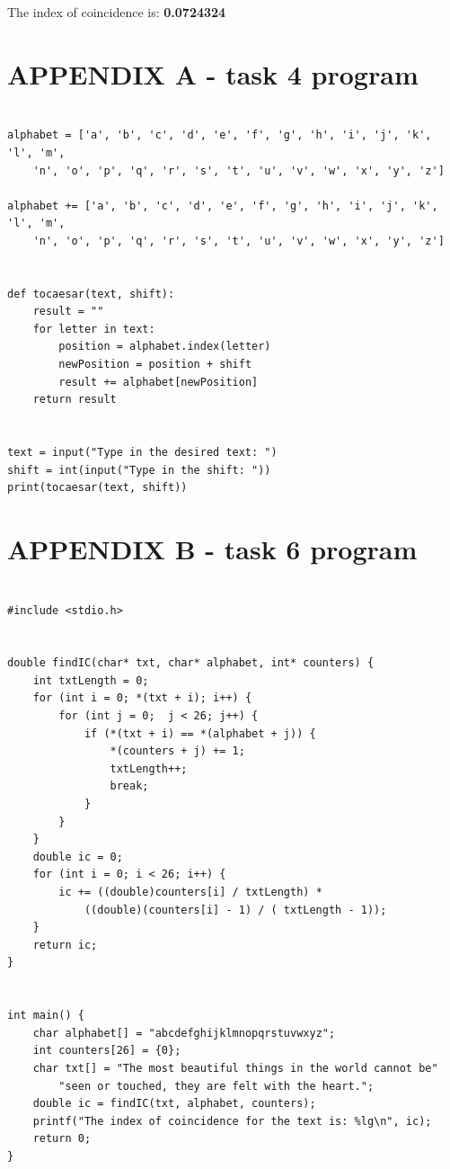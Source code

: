\documentclass[12pt]{article}
\begin{document}
\noindent The index of coincidence is: \textbf{0.0724324}


\section*{APPENDIX A - task 4 program}

\begin{lstlisting}

alphabet = ['a', 'b', 'c', 'd', 'e', 'f', 'g', 'h', 'i', 'j', 'k', 'l', 'm', 
    'n', 'o', 'p', 'q', 'r', 's', 't', 'u', 'v', 'w', 'x', 'y', 'z']

alphabet += ['a', 'b', 'c', 'd', 'e', 'f', 'g', 'h', 'i', 'j', 'k', 'l', 'm', 
    'n', 'o', 'p', 'q', 'r', 's', 't', 'u', 'v', 'w', 'x', 'y', 'z']


def tocaesar(text, shift):
    result = ""
    for letter in text:
        position = alphabet.index(letter)
        newPosition = position + shift 
        result += alphabet[newPosition]
    return result


text = input("Type in the desired text: ")
shift = int(input("Type in the shift: "))
print(tocaesar(text, shift))

\end{lstlisting}

\section*{APPENDIX B - task 6 program}

\begin{lstlisting}

#include <stdio.h>


double findIC(char* txt, char* alphabet, int* counters) {
    int txtLength = 0;
    for (int i = 0; *(txt + i); i++) {
        for (int j = 0;  j < 26; j++) {
            if (*(txt + i) == *(alphabet + j)) {
                *(counters + j) += 1;
                txtLength++;
                break;
            }
        }
    }
    double ic = 0;
    for (int i = 0; i < 26; i++) {
        ic += ((double)counters[i] / txtLength) * 
            ((double)(counters[i] - 1) / ( txtLength - 1)); 
    }
    return ic;
}


int main() {
    char alphabet[] = "abcdefghijklmnopqrstuvwxyz";
    int counters[26] = {0};
    char txt[] = "The most beautiful things in the world cannot be" 
        "seen or touched, they are felt with the heart.";
    double ic = findIC(txt, alphabet, counters);
    printf("The index of coincidence for the text is: %lg\n", ic);
    return 0;
}

\end{lstlisting}
\end{document}
